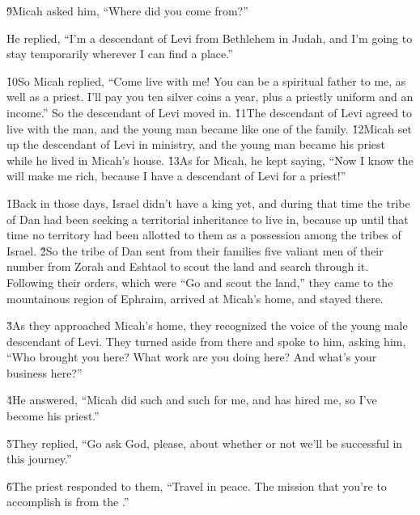 \v{9}Micah asked him, ``Where did you come from?''

He replied, ``I'm a descendant of Levi from Bethlehem in Judah, and I'm going to stay temporarily wherever I can find a place.''

\v{10}So Micah replied, ``Come live with me! You can be a spiritual father to me, as well as a priest. I'll pay you ten silver coins a year, plus a priestly uniform and an income.'' So the descendant of Levi moved in. \v{11}The descendant of Levi agreed to live with the man, and the young man became like one of the family. \v{12}Micah set up the descendant of Levi in ministry, and the young man became his priest while he lived in Micah's house. \v{13}As for Micah, he kept saying, ``Now I know the  will make me rich, because I have a descendant of Levi for a priest!''

\v{1}Back in those days, Israel didn't have a king yet, and during that time the tribe of Dan had been seeking a territorial inheritance to live in, because up until that time no territory had been allotted to them as a possession among the tribes of Israel. \v{2}So the tribe of Dan sent from their families five valiant men of their number from Zorah and Eshtaol to scout the land and search through it. Following their orders, which were ``Go and scout the land,'' they came to the mountainous region of Ephraim, arrived at Micah's home, and stayed there.

\v{3}As they approached Micah's home, they recognized the voice of the young male descendant of Levi. They turned aside from there and spoke to him, asking him, ``Who brought you here? What work are you doing here? And what's your business here?''

\v{4}He answered, ``Micah did such and such for me, and has hired me, so I've become his priest.''

\v{5}They replied, ``Go ask God, please, about whether or not we'll be successful in this journey.''

\v{6}The priest responded to them, ``Travel in peace. The mission that you're to accomplish is from the .''

